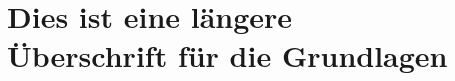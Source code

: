 \chapter[Dies ist eine längere Überschrift für die Grundlagen]{Dies ist eine längere\\[0.4cm]Überschrift für die Grundlagen}
  \label{chapter:grundlagen}

\Blindtext